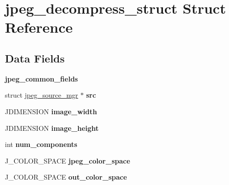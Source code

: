 \hypertarget{structjpeg__decompress__struct}{}\section{jpeg\+\_\+decompress\+\_\+struct Struct Reference}
\label{structjpeg__decompress__struct}
\subsection*{Data Fields}
\begin{DoxyCompactItemize}
\item 
\mbox{\label{structjpeg__decompress__struct_a9be75f402698aedbde0c0e499328af59}} 
{\bfseries jpeg\+\_\+common\+\_\+fields}
\item 
\mbox{\label{structjpeg__decompress__struct_afc6817e59959e5c26b51b03a2121d452}} 
struct \hyperlink{structjpeg__source__mgr}{jpeg\+\_\+source\+\_\+mgr} $\ast$ {\bfseries src}
\item 
\mbox{\label{structjpeg__decompress__struct_abb4a6d3633e5b412d8da7030e62362d1}} 
J\+D\+I\+M\+E\+N\+S\+I\+ON {\bfseries image\+\_\+width}
\item 
\mbox{\label{structjpeg__decompress__struct_a24f6e6fcab5d2e9fc0228419c181a657}} 
J\+D\+I\+M\+E\+N\+S\+I\+ON {\bfseries image\+\_\+height}
\item 
\mbox{\label{structjpeg__decompress__struct_ae111615d0ff14a34b42c364f436aed9f}} 
int {\bfseries num\+\_\+components}
\item 
\mbox{\label{structjpeg__decompress__struct_ad1db731be93151e7b43d453557857ce9}} 
J\+\_\+\+C\+O\+L\+O\+R\+\_\+\+S\+P\+A\+CE {\bfseries jpeg\+\_\+color\+\_\+space}
\item 
\mbox{\label{structjpeg__decompress__struct_aba615b1e70ae7d615d2038dc2422db8a}} 
J\+\_\+\+C\+O\+L\+O\+R\+\_\+\+S\+P\+A\+CE {\bfseries out\+\_\+color\+\_\+space}
\item 
\mbox{\label{structjpeg__decompress__struct_a584f789ebc86969b0543a898d996ac64}} 

\end{DoxyCompactItemize}
